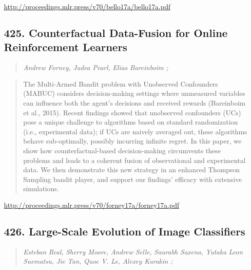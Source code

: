 \documentclass{article}
\begin{document}
\href{http://proceedings.mlr.press/v70/bello17a/bello17a.pdf}{http://proceedings.mlr.press/v70/bello17a/bello17a.pdf}

\subsection{425. Counterfactual Data-Fusion for Online Reinforcement Learners}

\begin{quote}
\footnotesize{\textit{Andrew Forney, Judea Pearl, Elias Bareinboim ;}}

\end{quote}

\begin{quote}
    The Multi-Armed Bandit problem with Unobserved Confounders (MABUC) considers decision-making settings where unmeasured variables can influence both the agent’s decisions and received rewards (Bareinboim et al., 2015). Recent findings showed that unobserved confounders (UCs) pose a unique challenge to algorithms based on standard randomization (i.e., experimental data); if UCs are naively averaged out, these algorithms behave sub-optimally, possibly incurring infinite regret. In this paper, we show how counterfactual-based decision-making circumvents these problems and leads to a coherent fusion of observational and experimental data. We then demonstrate this new strategy in an enhanced Thompson Sampling bandit player, and support our findings’ efficacy with extensive simulations.  
\end{quote}

\href{http://proceedings.mlr.press/v70/forney17a/forney17a.pdf}{http://proceedings.mlr.press/v70/forney17a/forney17a.pdf}

\subsection{426. Large-Scale Evolution of Image Classifiers}

\begin{quote}
\footnotesize{\textit{Esteban Real, Sherry Moore, Andrew Selle, Saurabh Saxena, Yutaka Leon Suematsu, Jie Tan, Quoc V. Le, Alexey Kurakin ;}}

\end{quote}
\end{document}
